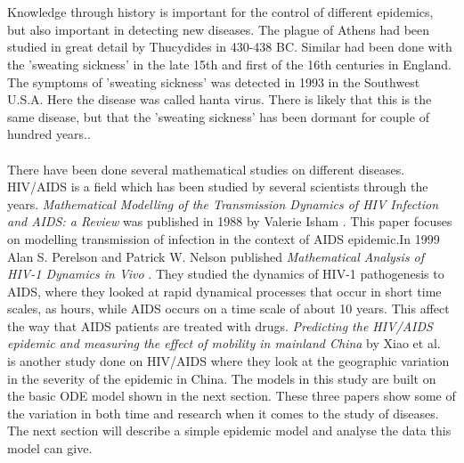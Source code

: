 \documentclass[%
twoside,                 %
final,                   %
chapterprefix=true,      %
open=right               %
10pt]{book}
\begin{document}
\\
\\
Knowledge through history is important for the control of different epidemics, but also important in detecting new diseases. The plague of Athens had been studied in great detail by Thucydides in 430-438 BC. Similar had been done with the 'sweating sickness' in the late 15th and first of the 16th centuries in England. The symptoms of 'sweating sickness' was detected in 1993 in the Southwest U.S.A. Here the disease was called hanta virus. There is likely that this is the same disease, but that the 'sweating sickness' has been dormant for couple of hundred years.\cite[p.~317]{murray2002mathematical}.~
\\
\\
There have been done several mathematical studies on different diseases. HIV/AIDS is a field which has been studied by several scientists through the years. \emph{Mathematical Modelling of the Transmission Dynamics of HIV Infection and AIDS: a Review} was published in 1988 by Valerie Isham \cite{isham1988mathematical}. This paper focuses on modelling transmission of infection in the context of AIDS epidemic.In 1999 Alan S. Perelson and Patrick W. Nelson published \emph{Mathematical Analysis of HIV-1 Dynamics in Vivo} \cite{perelson1999mathematical}. They studied the dynamics of HIV-1 pathogenesis to AIDS, where they looked at rapid dynamical processes that occur in short time scales, as hours, while AIDS occurs on a time scale of about 10 years. This affect the way that AIDS patients are treated with drugs. \emph{Predicting the HIV/AIDS epidemic and measuring the effect of mobility in mainland China} by Xiao et al.~\cite{xiao2013predicting} is another study done on HIV/AIDS where they look at the geographic variation in the severity of the epidemic in China. The models in this study are built on the basic ODE model shown in the next section. These three papers show some of the variation in both time and research when it comes to the study of diseases. The next section will describe a simple epidemic model and analyse the data this model can give. 


\newcommand{\Imax}{I_{\textrm{max}}}
\end{document}
